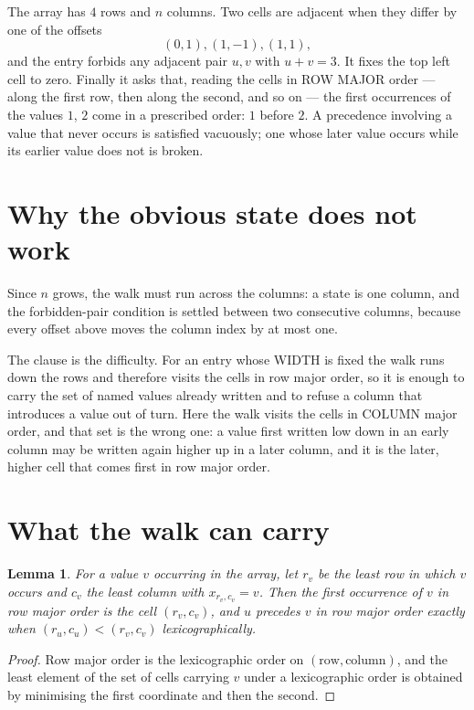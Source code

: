 \documentclass[11pt,a4paper]{article}
\theoremstyle{plain}
\newtheorem{lemma}[theorem]{Lemma}
\theoremstyle{definition}
\begin{document}
The array has $4$ rows and $n$ columns. Two cells are adjacent when they differ by one of the
offsets
\[
(0,1), (1,-1), (1,1),
\]
and the entry forbids any adjacent pair $u,v$ with $u+v=3$. It fixes the top left cell to
zero. Finally it asks that, reading the cells in ROW MAJOR order --- along the first row, then
along the second, and so on --- the first occurrences of the values $1$, $2$ come in a
prescribed order: $1$ before $2$. A precedence involving a value that never occurs is satisfied
vacuously; one whose later value occurs while its earlier value does not is broken.

\section{Why the obvious state does not work}

Since $n$ grows, the walk must run across the columns: a state is one column, and the
forbidden-pair condition is settled between two consecutive columns, because every offset above
moves the column index by at most one.

The clause is the difficulty. For an entry whose WIDTH is fixed the walk runs down the rows and
therefore visits the cells in row major order, so it is enough to carry the set of named values
already written and to refuse a column that introduces a value out of turn. Here the walk
visits the cells in COLUMN major order, and that set is the wrong one: a value first written
low down in an early column may be written again higher up in a later column, and it is the
later, higher cell that comes first in row major order.

\section{What the walk can carry}

\begin{lemma}\label{lem:key}
For a value $v$ occurring in the array, let $r_v$ be the least row in which $v$ occurs and
$c_v$ the least column with $x_{r_v,c_v}=v$. Then the first occurrence of $v$ in row major
order is the cell $(r_v,c_v)$, and $u$ precedes $v$ in row major order exactly when
$(r_u,c_u)<(r_v,c_v)$ lexicographically.
\end{lemma}

\begin{proof}
Row major order is the lexicographic order on $(\text{row},\text{column})$, and the least
element of the set of cells carrying $v$ under a lexicographic order is obtained by minimising
the first coordinate and then the second.
\end{proof}
\end{document}
